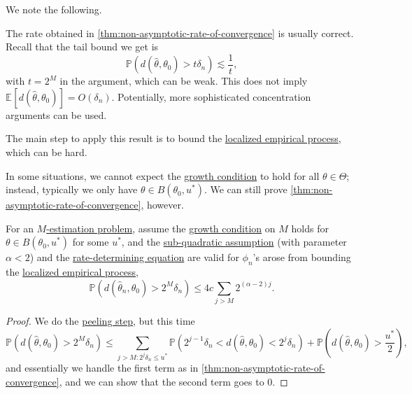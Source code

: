 We note the following.

\begin{remark}
	The rate obtained in \autoref{thm:non-asymptotic-rate-of-convergence} is usually correct. Recall that the tail bound we get is
	\[
		\mathbb{P} (d(\hat{\theta} , \theta _0) > t \delta _n) \lesssim \frac{1}{t},
	\]
	with \(t = 2^M\) in the argument, which can be weak. This does not imply \(\mathbb{E}_{}\left[d(\hat{\theta} , \theta _0) \right] = O(\delta _n)\). Potentially, more sophisticated concentration arguments can be used.
\end{remark}

\begin{remark}
	The main step  to apply this result is to bound the \hyperref[def:localized-EP]{localized empirical process}, which can be hard.
\end{remark}


In some situations, we cannot expect the \hyperref[def:growth-condition*]{growth condition} to hold for all \(\theta \in \Theta \); instead, typically we only have \(\theta \in B(\theta _0, u^{\ast} )\). We can still prove \autoref{thm:non-asymptotic-rate-of-convergence}, however.

\begin{theorem}\label{thm:non-asymptotic-rate-of-convergence-extend}
	For an \hyperref[prb:M-estimation]{\(M\)-estimation problem}, assume the \hyperref[def:growth-condition*]{growth condition} on \(M\) holds for \(\theta \in B(\theta _0, u^{\ast} )\) for some \(u^{\ast} \), and the \hyperref[def:sub-quadratic-assumption]{sub-quadratic assumption} (with parameter \(\alpha < 2\)) and the \hyperref[def:rate-determining-equation]{rate-determining equation} are valid for \(\phi _n\)'s arose from bounding the \hyperref[def:localized-EP]{localized empirical process},
	\[
		\mathbb{P} (d(\hat{\theta} _n, \theta _0) > 2^M \delta _n) \leq 4c \sum_{j > M} 2^{(\alpha -2) j}.
	\]
\end{theorem}
\begin{proof}
	We do the \hyperref[eq:peeling-step]{peeling step}, but this time
	\[
		\mathbb{P} (d(\hat{\theta} , \theta _0) > 2^M \delta _n)
		\leq \sum_{j > M\colon 2^j \delta _n \leq u^{\ast} } \mathbb{P} (2^{j-1} \delta _n < d(\hat{\theta} , \theta _0) < 2^j \delta _n) + \mathbb{P} \left( d(\hat{\theta} , \theta _0) > \frac{u^{\ast} }{2} \right),
	\]
	and essentially we handle the first term as in \autoref{thm:non-asymptotic-rate-of-convergence}, and we can show that the second term goes to \(0\).
\end{proof}

